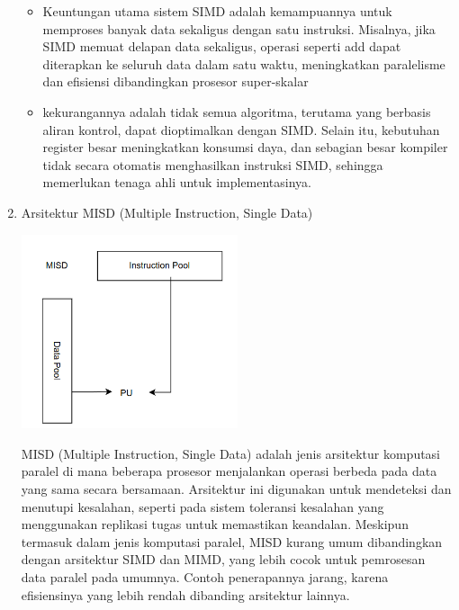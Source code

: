 \documentclass[12pt]{article}
\begin{document}
\begin{enumerate}
    \begin{itemize}
        \item Keuntungan utama sistem SIMD adalah kemampuannya untuk memproses banyak data sekaligus dengan satu instruksi. Misalnya, jika SIMD memuat delapan data sekaligus, operasi seperti add dapat diterapkan ke seluruh data dalam satu waktu, meningkatkan paralelisme dan efisiensi dibandingkan prosesor super-skalar
        \item kekurangannya adalah tidak semua algoritma, terutama yang berbasis aliran kontrol, dapat dioptimalkan dengan SIMD. Selain itu, kebutuhan register besar meningkatkan konsumsi daya, dan sebagian besar kompiler tidak secara otomatis menghasilkan instruksi SIMD, sehingga memerlukan tenaga ahli untuk implementasinya.
    \end{itemize}

    \item Arsitektur MISD (Multiple Instruction, Single Data)

        \noindent
        \begin{minipage}{\linewidth}
            \centering
            \includegraphics[width=0.5\textwidth]{asset/image8.png} 
        \end{minipage}
    
    MISD (Multiple Instruction, Single Data) adalah jenis arsitektur komputasi paralel di mana beberapa prosesor menjalankan operasi berbeda pada data yang sama secara bersamaan. Arsitektur ini digunakan untuk mendeteksi dan menutupi kesalahan, seperti pada sistem toleransi kesalahan yang menggunakan replikasi tugas untuk memastikan keandalan. Meskipun termasuk dalam jenis komputasi paralel, MISD kurang umum dibandingkan dengan arsitektur SIMD dan MIMD, yang lebih cocok untuk pemrosesan data paralel pada umumnya. Contoh penerapannya jarang, karena efisiensinya yang lebih rendah dibanding arsitektur lainnya.


\end{enumerate}
\end{document}
